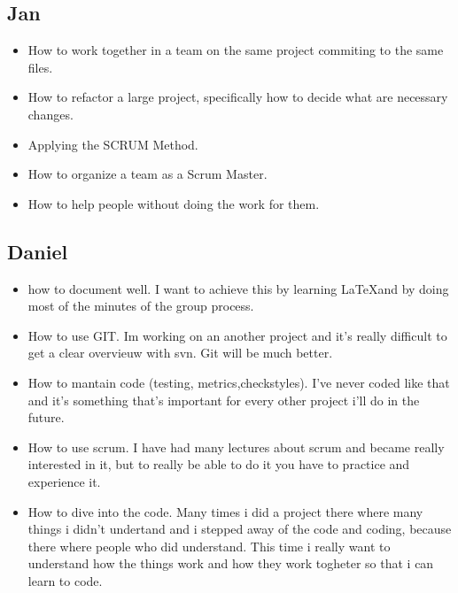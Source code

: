 \documentclass{article}
\begin{document}
\subsection*{Jan}
\begin{itemize}
	\item How to work together in a team on the same project commiting to the same files.
	\item How to refactor a large project, specifically how to decide what are necessary changes.
	\item Applying the SCRUM Method.
	\item How to organize a team as a Scrum Master.
	\item How to help people without doing the work for them.
\end{itemize}
\subsection*{Daniel} 
\begin{itemize}
	\item how to document well. I want to achieve this by learning \LaTeX  and by doing most of the  minutes of the group process. 
	\item How to use GIT. Im working on an another project and it's really difficult to get a clear overvieuw with svn. Git will be much better. 
	\item How to mantain code (testing, metrics,checkstyles). I've never coded like that and it's something that's important for every other project i'll do in the future. 
	\item How to use scrum. I have had many lectures about scrum and became really interested in it, but to really be able to do it you have to practice and experience it. 
	\item How to dive into the code. Many times i did a project there where many things i didn't undertand and i stepped away of the code and coding, because there where people who did understand. This time i really want to understand how the things work and how they work togheter so that i can learn to code.  
\end{itemize}
\end{document}
